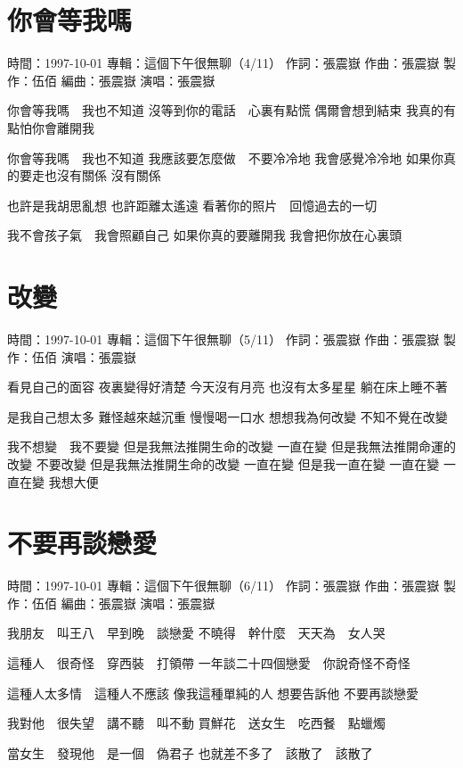 \documentclass[UTF8,a4paper,oneside,twocolumn,12pt]{ctexbook}
\newcommand{\infopair}[2]{\textbullet #1：#2}
\newcommand{\zc}[1][伍佰]{\infopair{作詞}{#1}}
\newcommand{\zq}[1][伍佰]{\infopair{作曲}{#1}}
\newcommand{\bq}[1][伍佰]{\infopair{編曲}{#1}}
\newcommand{\zj}[1]{\infopair{專輯}{#1}}
\newcommand{\zz}[1]{\infopair{製作}{#1}}
\newcommand{\sj}[1]{\infopair{時間}{#1}}
\newenvironment{info}{\begin{flushleft}\kaishu
	}
	{\end{flushleft}\normalsize\yahei\par}
\newenvironment{lyric}{
	}
{}
\begin{document}
\section{你會等我嗎}
\begin{info}
	\sj{1997-10-01}
	\zj{這個下午很無聊（4/11）}
	\zc[張震嶽]
	\zq[張震嶽]
	\zz{伍佰}
	\bq[張震嶽]
	\infopair{演唱}{張震嶽}
\end{info}
\begin{lyric}
	你會等我嗎　我也不知道
	沒等到你的電話　心裏有點慌
	偶爾會想到結束 我真的有點怕你會離開我

	你會等我嗎　我也不知道
	我應該要怎麼做　不要冷冷地
	我會感覺冷冷地 如果你真的要走也沒有關係
	沒有關係

	也許是我胡思亂想 也許距離太遙遠
	看著你的照片　回憶過去的一切

	我不會孩子氣　我會照顧自己
	如果你真的要離開我
	我會把你放在心裏頭
\end{lyric}

\section{改變}
\begin{info}
	\sj{1997-10-01}
	\zj{這個下午很無聊（5/11）}
	\zc[張震嶽]
	\zq[張震嶽]
	\zz{伍佰}
	\infopair{演唱}{張震嶽}
\end{info}
\begin{lyric}
	看見自己的面容 夜裏變得好清楚
	今天沒有月亮 也沒有太多星星
	躺在床上睡不著

	是我自己想太多 難怪越來越沉重
	慢慢喝一口水 想想我為何改變
	不知不覺在改變

	我不想變　我不要變
	但是我無法推開生命的改變 一直在變
	但是我無法推開命運的改變 不要改變
	但是我無法推開生命的改變 一直在變
	但是我一直在變 一直在變
	一直在變 我想大便
\end{lyric}

\section{不要再談戀愛}
\begin{info}
	\sj{1997-10-01}
	\zj{這個下午很無聊（6/11）}
	\zc[張震嶽]
	\zq[張震嶽]
	\zz{伍佰}
	\bq[張震嶽]
	\infopair{演唱}{張震嶽}
\end{info}
\begin{lyric}
	我朋友　叫王八　早到晚　談戀愛
	不曉得　幹什麼　天天為　女人哭

	這種人　很奇怪　穿西裝　打領帶
	一年談二十四個戀愛　你說奇怪不奇怪

	這種人太多情　這種人不應該
	像我這種單純的人 想要告訴他
	不要再談戀愛

	我對他　很失望　講不聽　叫不動
	買鮮花　送女生　吃西餐　點蠟燭

	當女生　發現他　是一個　偽君子
	也就差不多了　該散了　該散了
\end{lyric}
\end{document}

